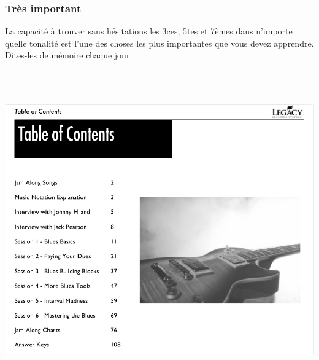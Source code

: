\documentclass[a4paper]{book}
\begin{document}
\subsubsection{Très important}
La capacité à trouver sans hésitations les 3ces, 5tes et 7èmes dans n'importe quelle tonalité est l'une des choses les plus importantes que vous devez apprendre. Dites-les de mémoire chaque jour.




\begin{center}
\includegraphics[width=17cm,height=13.765cm]{lebluessupportsmethodes-img124.png}
\end{center}












\clearpage
\end{document}

